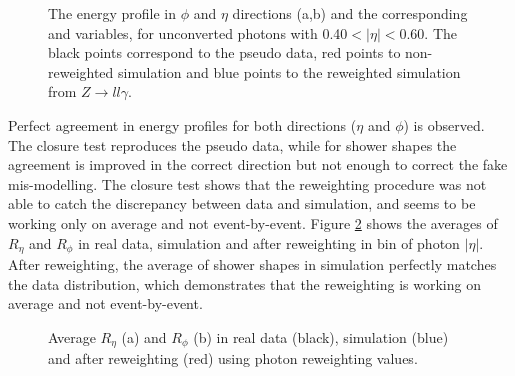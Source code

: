 \begin{figure}[htbp]
	\begin{tcolorbox}[colback=black!5!white,colframe=white!75!black]
    \caption{The energy profile in $\phi$ and $\eta$ directions (a,b) and the corresponding \Rphi and \Reta variables, for unconverted photons with 0.40$<|\eta|<$0.60. The black points correspond to the pseudo data, red points to non-reweighted simulation and blue points to the reweighted simulation from $Z\rightarrow ll\gamma$.}
    \label{fig:gamma:ss:reweighting:photon:closure}
    \end{tcolorbox}
    
\end{figure}
Perfect agreement in energy profiles for both directions ($\eta$ and $\phi$) is observed. The closure test reproduces the pseudo data, while for shower shapes the agreement is improved in the correct direction but not enough to correct the fake mis-modelling. The closure test shows that the reweighting procedure was not able to catch the discrepancy between data and simulation, and seems to be working only on average and not event-by-event. Figure \ref{fig:gamma:ss:reweighting:photon:closure:avg} shows the averages of $R_{\eta}$ and $R_{\phi}$ in real data, simulation and after reweighting in bin of photon $|\eta|$. After reweighting, the average of shower shapes in simulation perfectly matches the data distribution, which demonstrates that the reweighting is working on average and not event-by-event.

\begin{figure}[htbp]
    \centering
    \begin{tcolorbox}[colback=black!5!white,colframe=white!75!black]
    \caption{Average $R_{\eta}$ (a) and $R_{\phi}$ (b) in real data (black), simulation (blue) and after reweighting (red) using photon reweighting values.}
    \label{fig:gamma:ss:reweighting:photon:closure:avg}
    \end{tcolorbox}
\end{figure}

